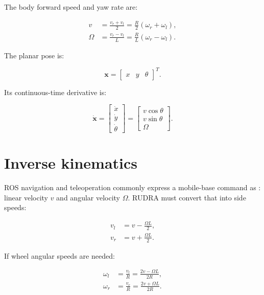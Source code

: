 The body forward speed and yaw rate are:

\begin{align}
v &= \frac{v_r+v_l}{2} = \frac{R}{2}(\omega_r+\omega_l), \label{eq:body-v}\\
\Omega &= \frac{v_r-v_l}{L} = \frac{R}{L}(\omega_r-\omega_l). \label{eq:body-w}
\end{align}

The planar pose is:

\begin{equation}
\mathbf{x}=\begin{bmatrix}x & y & \theta\end{bmatrix}^T.
\end{equation}

Its continuous-time derivative is:

\begin{equation}
\dot{\mathbf{x}} =
\begin{bmatrix}
\dot{x}\\ \dot{y}\\ \dot{\theta}
\end{bmatrix}
=
\begin{bmatrix}
v\cos\theta\\ v\sin\theta\\ \Omega
\end{bmatrix}.
\label{eq:pose-derivative}
\end{equation}

\section{Inverse kinematics}

ROS navigation and teleoperation commonly express a mobile-base command as : linear velocity \(v\) and angular velocity \(\Omega\). RUDRA must convert that into side speeds:

\begin{align}
v_l &= v - \frac{\Omega L}{2}, \label{eq:left-side-speed}\\
v_r &= v + \frac{\Omega L}{2}. \label{eq:right-side-speed}
\end{align}

If wheel angular speeds are needed:

\begin{align}
\omega_l &= \frac{v_l}{R}=\frac{2v-\Omega L}{2R},\\
\omega_r &= \frac{v_r}{R}=\frac{2v+\Omega L}{2R}.
\end{align}

